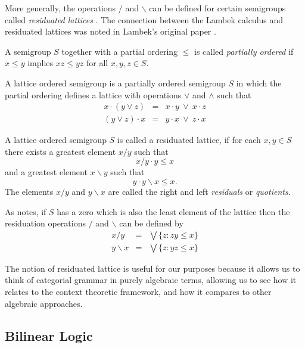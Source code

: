 \documentclass[12pt]{report}
\begin{document}
More generally, the operations $/$ and $\backslash$ can be defined for certain semigroups called \emph{residuated lattices} \citep{Birkhoff:48}. The connection between the Lambek calculus and residuated lattices was noted in Lambek's original paper \citep{Lambek:58}.

\begin{defn}
A semigroup $S$ together with a partial ordering $\le$ is called \emph{partially ordered} if $x \le y$ implies $xz \le yz$ for all $x,y,z \in S$.
\end{defn}

\begin{defn}
A lattice ordered semigroup is a partially ordered semigroup $S$ in which the partial ordering defines a lattice with operations $\lor$ and $\land$ such that
\begin{eqnarray*}
x\cdot (y\lor z) &=& x\cdot y\  \lor\ x\cdot z\\
(y\lor z)\cdot x &=& y\cdot x\ \lor\ z\cdot x
\end{eqnarray*}
\end{defn}

\begin{defn}
A lattice ordered semigroup $S$ is called a residuated lattice, if for each $x,y \in S$ there exists a greatest element $x/y$ such that
$$x/y \cdot y \le x$$
and a greatest element $x\backslash y$ such that
$$y \cdot y\backslash x \le x.$$
The elements $x/y$ and $y\backslash x$ are called the right and left \emph{residuals} or \emph{quotients}.
\end{defn}

As \cite{Birkhoff:48} notes, if $S$ has a zero which is also the least element of the lattice then the residuation operations $/$ and $\backslash$ can be defined by
\begin{eqnarray*}
x/y &=& \bigvee\{z : zy \le x\}\\
y\backslash x &=& \bigvee\{z : yz \le x\}
\end{eqnarray*}

The notion of residuated lattice is useful for our purposes because it allows us to think of categorial grammar in purely algebraic terms, allowing us to see how it relates to the context theoretic framework, and how it compares to other algebraic approaches.

\subsection{Bilinear Logic}
\end{document}
